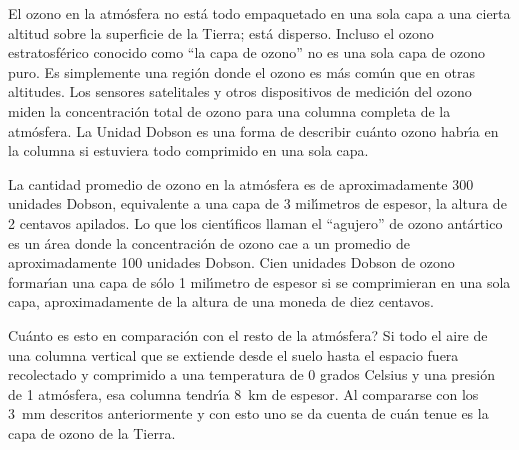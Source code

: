 El ozono en la atm\'osfera no est\'a todo empaquetado en una sola capa a una cierta altitud sobre la superficie de la Tierra; est\'a disperso. Incluso el ozono estratosf\'erico conocido como ``la capa de ozono'' no es una sola capa de ozono puro. Es simplemente una regi\'on donde el ozono es m\'as com\'un que en otras altitudes. Los sensores satelitales y otros dispositivos de medici\'on del ozono miden la concentraci\'on total de ozono para una columna completa de la atm\'osfera. La Unidad Dobson es una forma de describir cu\'anto ozono habr\'{\i}a en la columna si estuviera todo comprimido en una sola capa.

La cantidad promedio de ozono en la atm\'osfera es de aproximadamente 300 unidades Dobson, equivalente a una capa de 3 mil\'{\i}metros de espesor, la altura de 2 centavos apilados. Lo que los cient\'{\i}ficos llaman el ``agujero'' de ozono ant\'artico es un \'area donde la concentraci\'on de ozono cae a un promedio de aproximadamente 100 unidades Dobson. Cien unidades Dobson de ozono formar\'{\i}an una capa de s\'olo 1 mil\'{\i}metro de espesor si se comprimieran en una sola capa, aproximadamente de la altura de una moneda de diez centavos.

\textquestiondown Cu\'anto es esto en comparaci\'on con el resto de la atm\'osfera?  Si todo el aire de una columna vertical que se extiende desde el suelo hasta el espacio fuera recolectado y comprimido a una temperatura de 0 grados Celsius y una presi\'on de 1 atm\'osfera, esa columna tendr\'{\i}a \SI{8}{\kilo\metre} de espesor. Al compararse con los \SI{3}{\milli\metre} descritos anteriormente y con esto uno se da cuenta de cu\'an tenue es la capa de ozono de la Tierra.


